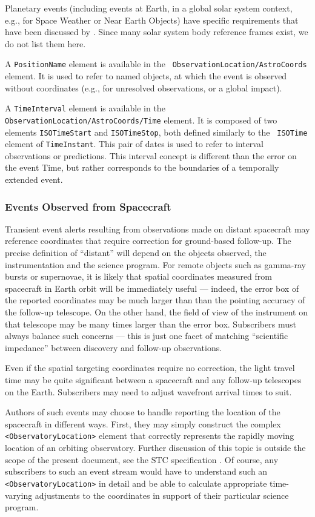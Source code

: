 \documentclass[11pt,a4paper]{ivoa}
\begin{document}
Planetary events (including events at Earth, in a global solar system context,
e.g., for Space Weather or Near Earth Objects) have specific requirements that 
have been discussed by \citet{2018arXiv181112680C}. Since many solar system body 
reference frames exist, we do not list them here. 

A {\tt PositionName} element is available in the {\tt
ObservationLocation/Ast\-roCoords} element. It is used to refer to named objects,
at which the event is observed without coordinates (e.g., for unresolved
observations, or a global impact).

A {\tt TimeInterval} element is available in the {\tt
ObservationLocation/Astro\-Coords/Time} element. It is composed of two elements
{\tt ISOTimeStart} and {\tt ISOTimeStop}, both defined similarly to the {\tt
ISOTime} element of {\tt TimeInstant}. This pair of dates is used to refer to
interval observations or predictions. This interval concept is different than
the error on the event Time, but rather corresponds to the boundaries of a
temporally extended event.


\subsubsection{Events Observed from Spacecraft}
\label{sec:3.4.5}
Transient event alerts resulting from observations made on distant spacecraft
may reference coordinates that require correction for ground-based follow-up.
The precise definition of ``distant'' will depend on the objects observed, the
instrumentation and the science program. For remote objects such as gamma-ray
bursts or supernovae, it is likely that spatial coordinates measured from
spacecraft in Earth orbit will be immediately useful --- indeed, the error box
of the reported coordinates may be much larger than than the pointing accuracy
of the follow-up telescope. On the other hand, the field of view of the
instrument on that telescope may be many times larger than the error box.
Subscribers must always balance such concerns --- this is just one facet of
matching ``scientific impedance'' between discovery and follow-up observations.

Even if the spatial targeting coordinates require no correction, the light
travel time may be quite significant between a spacecraft and any follow-up
telescopes on the Earth. Subscribers may need to adjust wavefront arrival times
to suit.

Authors of such events may choose to handle reporting the location of the
spacecraft in different ways. First, they may simply construct the complex {\tt
<ObservatoryLocation>} element that correctly represents the rapidly moving
location of an orbiting observatory. Further discussion of this topic is outside
the scope of the present document, see the STC specification
\citep{2007ivoa.spec.1030R}. Of course, any subscribers to such an event stream
would have to understand such an {\tt <ObservatoryLocation>} in detail and be
able to calculate appropriate time-varying adjustments to the coordinates in
support of their particular science program.
\end{document}
